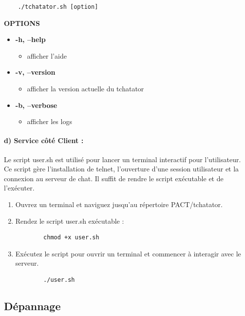 \documentclass{report}
\begin{document}
\begin{verbatim}
	./tchatator.sh [option]
\end{verbatim}

\large \textbf{OPTIONS}

\begin{itemize}[label={}]
	\item \textbf{-h, --help}
	\begin{itemize}
		\item afficher l’aide
	\end{itemize}
	\item \textbf{-v, --version}
	\begin{itemize}
		\item afficher la version actuelle du tchatator
	\end{itemize}
	\item \textbf{-b, --verbose}
	\begin{itemize}
		\item afficher les logs
	\end{itemize}
\end{itemize}

\paragraph{d) Service côté Client :}

Le script user.sh est utilisé pour lancer un terminal interactif pour l'utilisateur. Ce script gère l'installation de telnet, l'ouverture d'une session utilisateur et la connexion au serveur de chat. Il suffit de rendre le script exécutable et de l'exécuter.

\begin{enumerate}
	\item Ouvrez un terminal et naviguez jusqu'au répertoire PACT/tchatator.
	
	\item Rendez le script user.sh exécutable :
	\begin{verbatim}
		chmod +x user.sh
	\end{verbatim}
	
	\item Exécutez le script pour ouvrir un terminal et commencer à interagir avec le serveur.
	
	\begin{verbatim}
		./user.sh
	\end{verbatim}
\end{enumerate}

\subsection{Dépannage}
\end{document}
